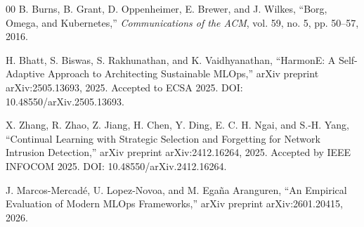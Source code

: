 \documentclass[runningheads]{llncs}
\begin{document}
\begin{thebibliography}{00}
B. Burns, B. Grant, D. Oppenheimer, E. Brewer, and J. Wilkes, ``Borg, Omega, and Kubernetes,'' \textit{Communications of the ACM}, vol. 59, no. 5, pp. 50--57, 2016.

H. Bhatt, S. Biswas, S. Rakhunathan, and K. Vaidhyanathan,
``HarmonE: A Self-Adaptive Approach to Architecting Sustainable MLOps,''
arXiv preprint arXiv:2505.13693, 2025. Accepted to ECSA 2025.
DOI: 10.48550/arXiv.2505.13693.

X. Zhang, R. Zhao, Z. Jiang, H. Chen, Y. Ding, E. C. H. Ngai, and S.-H. Yang,
``Continual Learning with Strategic Selection and Forgetting for Network Intrusion Detection,''
arXiv preprint arXiv:2412.16264, 2025. Accepted by IEEE INFOCOM 2025.
DOI: 10.48550/arXiv.2412.16264.

J. Marcos-Mercad\'e, U. Lopez-Novoa, and M. Ega\~na Aranguren,
``An Empirical Evaluation of Modern MLOps Frameworks,''
arXiv preprint arXiv:2601.20415, 2026.

\end{thebibliography}
\end{document}

